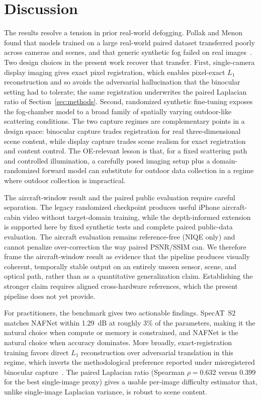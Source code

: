 \documentclass{optica-article}
\begin{document}
 
\section{Discussion}
\label{sec:discussion}

The results resolve a tension in prior real-world defogging.
Pollak and Menon found that models trained on a large real-world
paired dataset transferred poorly across cameras and scenes, and
that generic synthetic fog failed on real
images~\cite{pollak2024stereofog}. Two design choices in the present
work recover that transfer. First, single-camera display imaging
gives exact pixel registration, which enables pixel-exact
$L_1$ reconstruction and so avoids the adversarial hallucination
that the binocular setting had to tolerate; the same registration
underwrites the paired Laplacian ratio of Section~\ref{sec:methods}.
Second,  randomized synthetic fine-tuning exposes the fog-chamber
model to a broad family of spatially varying outdoor-like
scattering conditions. The two capture regimes
are complementary points in a design space: binocular capture trades
registration for real three-dimensional scene content, while display
capture trades scene realism for exact registration and content
control. The OE-relevant lesson is that, for a fixed scattering
path and controlled illumination, a carefully posed imaging setup
plus a domain-randomized forward model can substitute for outdoor data
collection in a regime where outdoor collection is impractical.

The aircraft-window result and the paired public evaluation require
careful separation. The legacy randomized checkpoint produces useful
iPhone aircraft-cabin video without target-domain training, while the
depth-informed extension is supported here by fixed synthetic tests and
complete paired public-data evaluation. The aircraft evaluation remains
reference-free (NIQE only) and cannot penalize over-correction the way
paired PSNR/SSIM can. We therefore frame the
aircraft-window result as evidence that the pipeline produces
visually coherent, temporally stable output on an entirely unseen
sensor, scene, and optical path, rather than as a quantitative
generalization claim. Establishing the stronger claim requires
aligned cross-hardware references, which the present pipeline does
not yet provide.

For practitioners, the benchmark gives two actionable findings.
SpecAT~S2 matches NAFNet within 1.29~dB at roughly 3\% of the
parameters, making it the natural choice when compute or memory is
constrained, and NAFNet is the natural choice when accuracy
dominates. More broadly, exact-registration training favors direct
$L_1$ reconstruction over adversarial translation in this regime,
which inverts the methodological preference reported under
misregistered binocular capture~\cite{pollak2024stereofog}. The
paired Laplacian ratio (Spearman $\rho = 0.632$ versus $0.399$ for
the best single-image proxy) gives a usable per-image difficulty
estimator that, unlike single-image Laplacian variance, is robust
to scene content.
\end{document}
